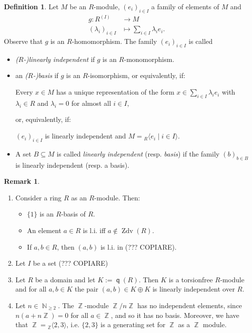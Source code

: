 \documentclass[12pt,a4paper]{report}
\theoremstyle{definition}
\newtheorem{defn}[theorem]{Definition}
\newtheorem*{remark}{Remark}
\theoremstyle{num.custom-title}
\DeclareMathOperator{\Zdv}{Zdv}
\DeclareMathOperator{\N}{\mathbb{N}}
\DeclareMathOperator{\Z}{\mathbb{Z}}
\DeclareMathOperator{\sse}{\subseteq}
\DeclareMathOperator{\q}{\mathsf{q}}
\begin{document}
\begin{defn}\label{def-basis}
Let $M$ be an $R$-module, $(e_i)_{i \in I}$ a family of elements of $M$ and
\begin{align*}
g \colon R^{(I)} &\to M \\
(\lambda_i)_{i \in I} &\mapsto \sum_{i \in I} \lambda_i e_i.
\end{align*}
Observe that $g$ is an $R$-homomorphism. The family $(e_i)_{i \in I}$ is called
\begin{itemize}
\item \emph{($R$-)linearly independent} if $g$ is an $R$-monomorphism.
\item an \emph{($R$-)basis} if $g$ is an $R$-isomorphism, or equivalently, if:
\begin{center}
Every $x \in M$ has a unique representation of the form $x \in \sum_{i \in I} \lambda_i e_i$ with $\lambda_i \in R$ and $\lambda_i=0$ for almost all $i \in I$,
\end{center}
or, equivalently, if:
\begin{center}
$(e_i)_{i \in I}$ is linearly independent and $M = {}_R \langle e_i \mid i \in I \rangle$.
\end{center}
\item A set $B \sse M$ is called \emph{linearly independent} (resp. \emph{basis}) if the family $(b)_{b \in B}$ is linearly independent (resp. a basis).
\end{itemize}
\end{defn}

\begin{remark}\ 
\begin{enumerate}
\item Consider a ring $R$ as an $R$-module. Then:
\begin{itemize}
\item $\{1\}$ is an $R$-basis of $R$.
\item An element $a \in R$ is l.i. iff $a \not\in \Zdv(R)$.
\item If $a,b \in R$, then $(a,b)$ is l.i. in (??? COPIARE).
\end{itemize}
\item Let $I$ be a set (??? COPIARE)
\item Let $R$ be a domain and let $K := \q(R)$. Then $K$ is a torsionfree $R$-module and for all $a,b \in K$ the pair $(a,b) \in K \oplus K$ is linearly independent over $R$.
\item Let $n \in \N_{\geq 2}$. The $\Z$-module $\Z/n\Z$ has no independent elements, since $n(a+n\Z)=0$ for all $a \in \Z$, and so it has no basis. Moreover, we have that $\Z = {}_{\Z} \langle 2,3 \rangle$, i.e. $\{2,3\}$ is a generating set for $\Z$ as a $\Z$ module.
\end{enumerate}
\end{remark}
\end{document}
